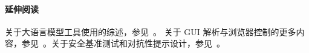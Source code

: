 \paragraph{延伸阅读}
关于大语言模型工具使用的综述，参见~\citet{shen2024llm,patil2023gorillalargelanguagemodel,qin2023toolllm}。
关于 GUI 解析与浏览器控制的更多内容，参见~\citet{lu2024omniparserpurevisionbased,browser_use2024}。关于安全基准测试和对抗性提示设计，参见~\citet{wang2025comprehensive}。



